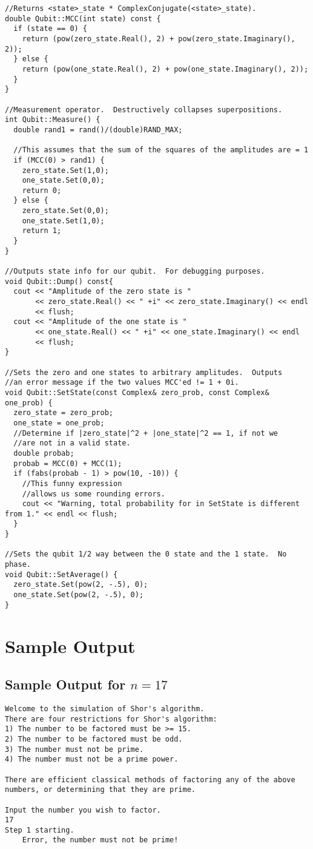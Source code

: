 \documentclass[]{article}
\begin{document}
\begin{verbatim}
//Returns <state>_state * ComplexConjugate(<state>_state).
double Qubit::MCC(int state) const {
  if (state == 0) {
    return (pow(zero_state.Real(), 2) + pow(zero_state.Imaginary(), 2));
  } else {
    return (pow(one_state.Real(), 2) + pow(one_state.Imaginary(), 2));
  }
}

//Measurement operator.  Destructively collapses superpositions.
int Qubit::Measure() {
  double rand1 = rand()/(double)RAND_MAX;

  //This assumes that the sum of the squares of the amplitudes are = 1
  if (MCC(0) > rand1) {
    zero_state.Set(1,0);
    one_state.Set(0,0);
    return 0;
  } else {
    zero_state.Set(0,0);
    one_state.Set(1,0);
    return 1;
  } 
}

//Outputs state info for our qubit.  For debugging purposes.
void Qubit::Dump() const{
  cout << "Amplitude of the zero state is "
       << zero_state.Real() << " +i" << zero_state.Imaginary() << endl 
       << flush;
  cout << "Amplitude of the one state is "
       << one_state.Real() << " +i" << one_state.Imaginary() << endl 
       << flush;
}

//Sets the zero and one states to arbitrary amplitudes.  Outputs
//an error message if the two values MCC'ed != 1 + 0i.
void Qubit::SetState(const Complex& zero_prob, const Complex& one_prob) {
  zero_state = zero_prob;
  one_state = one_prob;
  //Determine if |zero_state|^2 + |one_state|^2 == 1, if not we 
  //are not in a valid state.
  double probab;
  probab = MCC(0) + MCC(1);
  if (fabs(probab - 1) > pow(10, -10)) {  
    //This funny expression 
    //allows us some rounding errors.
    cout << "Warning, total probability for in SetState is different from 1." << endl << flush;
  }
}

//Sets the qubit 1/2 way between the 0 state and the 1 state.  No phase.
void Qubit::SetAverage() {
  zero_state.Set(pow(2, -.5), 0);
  one_state.Set(pow(2, -.5), 0);
}

\end{verbatim}
\pagebreak

\section{Sample Output}
\subsection{Sample Output for $n = 17$}
\begin{verbatim}
Welcome to the simulation of Shor's algorithm.
There are four restrictions for Shor's algorithm:
1) The number to be factored must be >= 15.
2) The number to be factored must be odd.
3) The number must not be prime.
4) The number must not be a prime power.

There are efficient classical methods of factoring any of the above
numbers, or determining that they are prime.

Input the number you wish to factor.
17
Step 1 starting.
	Error, the number must not be prime!
\end{verbatim}
\pagebreak
\end{document}
